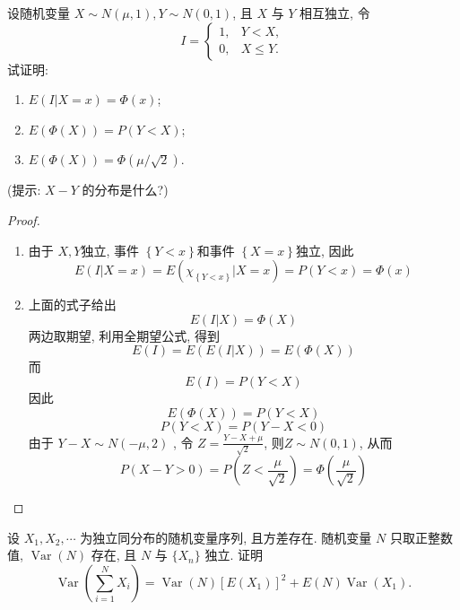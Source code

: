 \documentclass[../main.tex]{subfiles}
\begin{document}
\begin{exercise}{}{}
设随机变量 $X \sim N(\mu, 1), Y \sim N(0, 1)$, 且 $X$ 与 $Y$ 相互独立, 令
\[
I = \begin{cases} 1, & Y < X, \\ 0, & X \leqslant Y. \end{cases}
\]
试证明:
\begin{enumerate}
\item $E(I|X=x) = \Phi(x)$;
\item $E(\Phi(X)) = P(Y < X)$;
\item $E(\Phi(X)) = \Phi(\mu/\sqrt{2})$.
\end{enumerate}
(提示: $X-Y$ 的分布是什么?)
\end{exercise}
\begin{proof}
    \begin{enumerate}
     \item  由于 \(  X,Y  \)独立, 事件 \(  \left\{ Y< x \right\}  \)和事件 \(  \left\{ X= x \right\}  \)独立, 因此   \[
     E\left( I|X= x \right)= E\left( \chi _{\left\{ Y< x \right\}} |X= x\right)  =P\left( Y< x \right) = \Phi \left( x \right) 
     \]
     \item 上面的式子给出 \[
     E\left( I|X \right)= \Phi \left( X \right)  
     \] 两边取期望, 利用全期望公式, 得到 \[
     E\left( I \right)= E\left( E\left( I|X \right)  \right)= E\left( \Phi \left( X \right)  \right)   
     \]而 \[
     E\left( I \right)= P\left( Y< X \right)  
     \]因此 \[
     E\left( \Phi \left( X \right)  \right)= P\left( Y< X \right)  
     \] \[
     P\left( Y< X \right)= P\left( Y-X< 0\right)  
     \]由于 \(  Y-X\sim N\left( -\mu  , 2 \right)   \) , 令 \(  Z= \frac{Y-X+ \mu  }{\sqrt{2} }   \), 则\(  Z\sim N\left( 0,1 \right)   \), 从而 \[
     P\left( X-Y> 0 \right)= P\left(Z< \frac{\mu  }{\sqrt{2} }   \right)= \Phi \left( \frac{\mu  }{\sqrt{2} }  \right)   
     \]  
    \end{enumerate}
    
\end{proof}

\begin{exercise}{}{}
设 $X_1, X_2, \cdots$ 为独立同分布的随机变量序列, 且方差存在. 随机变量 $N$ 只取正整数值, $\operatorname{Var}(N)$ 存在, 且 $N$ 与 $\{X_n\}$ 独立. 证明
\[
\operatorname{Var}\left(\sum_{i=1}^N X_i\right) = \operatorname{Var}(N)[E(X_1)]^2 + E(N)\operatorname{Var}(X_1).
\]
\end{exercise}
\end{document}
